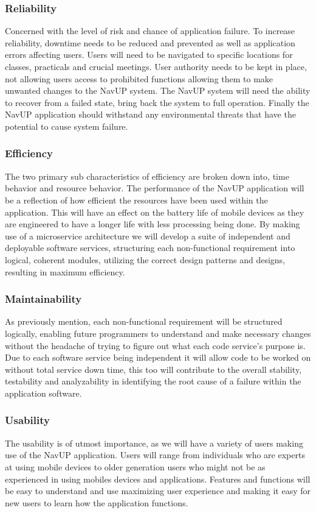 \documentclass{article}
\begin{document}
		\subsubsection{Reliability}
		Concerned with the level of risk and chance of application failure. To increase reliability, downtime needs to be reduced and prevented as well as application errors affecting users. Users will need to be navigated to specific locations for classes, practicals and crucial meetings. User authority needs to be kept in place, not allowing users access to prohibited functions allowing them to make unwanted changes to the NavUP system. The NavUP system will need the ability to recover from a failed state, bring back the system to full operation. Finally the NavUP application should withstand any environmental threats that have the potential to cause system failure.
		 
		\subsubsection{Efficiency}
		The two primary sub characteristics of efficiency are broken down into, time behavior and resource behavior. The performance of the NavUP application will be a reflection of how efficient the resources have been used within the application. This will have an effect on the battery life of mobile devices as they are engineered to have a longer life with less processing being done.
		By making use of a microservice architecture we will develop a suite of independent and deployable software services, structuring each non-functional requirement into logical, coherent modules, utilizing the correct design patterns and designs, resulting in maximum efficiency.
		
		\subsubsection{Maintainability}
		As previously mention, each non-functional requirement will be structured logically, enabling future programmers to understand and make necessary changes without the headache of trying to figure out what each code service's purpose is. Due to each software service being independent it will allow code to be worked on without total service down time, this too will contribute to the overall stability, testability and analyzability in identifying the root cause of a failure within the application software.
		
		\subsubsection{Usability}
		The usability is of utmost importance, as we will have a variety of users making use of the NavUP application. Users will range from individuals who are experts at using mobile devices to older generation users who might not be as experienced in using mobiles devices and applications. Features and functions will be easy to understand and use maximizing user experience and making it easy for new users to learn how the application functions.
		
\end{document}
